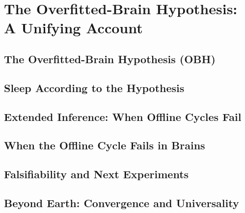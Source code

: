 \part{The Overfitted-Brain Hypothesis: A Unifying Account}\label{part:obh}
\newpage

\chapter{The Overfitted-Brain Hypothesis (OBH)}\label{ch:obh}




\chapter{Sleep According to the Hypothesis}\label{ch:nightly_alternation}




\chapter{Extended Inference: When Offline Cycles Fail}\label{ch:extended_inference}


\chapter{When the Offline Cycle Fails in Brains}\label{ch:offline_failure}



\chapter{Falsifiability and Next Experiments}\label{ch:falsifiability}


\chapter{Beyond Earth: Convergence and Universality}\label{ch:universality}

